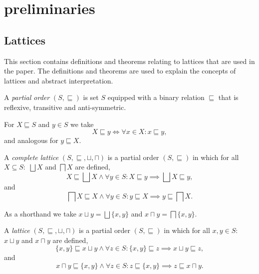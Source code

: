 
\section{preliminaries}\label{sec:preliminaries}

\subsection{Lattices}\label{sec:lattices}
This section contains definitions and theorems relating to lattices that are used in the paper.
The definitions and theorems are used to explain the concepts of lattices and abstract interpretation.\cite{nielson_formal_2019}
\begin{definition}
    A \textit{partial order} $(S, \sqsubseteq)$ is set $S$ equipped with a binary relation $\sqsubseteq$ that is reflexive, transitive and anti-symmetric.
\end{definition}

For $X \sqsubseteq S$ and $y \in S$ we take
\begin{equation*}
    X \sqsubseteq y \iff \forall x \in X : x \sqsubseteq y,
\end{equation*}
and analogous for $y \sqsubseteq X$.

\begin{definition}
    A \textit{complete lattice} $(S, \sqsubseteq, \sqcup, \sqcap)$ is a partial order $(S, \sqsubseteq)$ in which for all $X \subseteq S:$ $\bigsqcup X$ and $\bigsqcap X$ are defined,
        \begin{equation*}
            X \sqsubseteq \bigsqcup X \land \forall y \in S : X \sqsubseteq y \implies \bigsqcup X \sqsubseteq y,
        \end{equation*}
        and
        \begin{equation*}
            \bigsqcap X \sqsubseteq X \land \forall y \in S : y \sqsubseteq X \implies y \sqsubseteq \bigsqcap X.
        \end{equation*}
\end{definition}

As a shorthand we take $x \sqcup y = \bigsqcup \{x, y\}$ and $x \sqcap y = \bigsqcap \{x, y\}$.

\begin{definition}
    A \textit{lattice} $(S, \sqsubseteq, \sqcup, \sqcap)$ is a partial order $(S, \sqsubseteq)$ in which for all $x,y \in S:$ $x \sqcup y$ and $x \sqcap y$ are defined,
        \begin{equation*}
            \{x, y\} \sqsubseteq x \sqcup y \land \forall z \in S : \{x, y\} \sqsubseteq z \implies x \sqcup y \sqsubseteq z,
        \end{equation*}
        and
        \begin{equation*}
            x \sqcap y \sqsubseteq \{x, y\} \land \forall z \in S : z \sqsubseteq \{x, y\} \implies z \sqsubseteq x \sqcap y.
        \end{equation*}
\end{definition}

